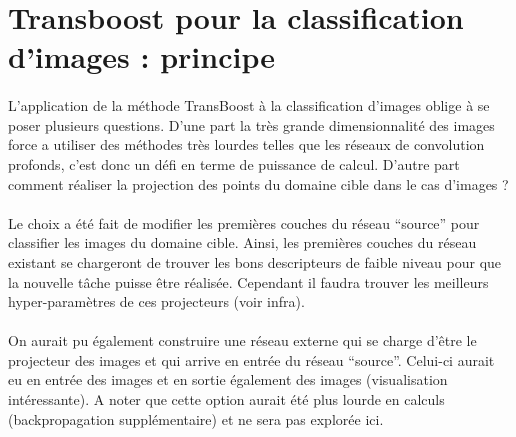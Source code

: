 \documentclass[11 pt]{article}
\begin{document}
\section{Transboost pour la classification d'images : principe}

\paragraph{}L’application de la méthode TransBoost à la classification d’images oblige à se poser plusieurs questions. D’une part la très grande dimensionnalité des images force a utiliser des méthodes très lourdes telles que les réseaux de convolution profonds, c'est donc un défi en terme de puissance de calcul. D’autre part comment réaliser la projection des points du domaine cible dans le cas d'images ?


\paragraph{} Le choix a été fait de modifier les premières couches du réseau ``source'' pour classifier les images du domaine cible. Ainsi, les premières couches du réseau existant se chargeront de trouver les bons descripteurs de faible niveau pour que la nouvelle tâche puisse être réalisée. Cependant il faudra trouver les meilleurs hyper-paramètres de ces projecteurs (voir infra).

\paragraph{} On aurait pu également construire une réseau externe qui se charge d'être le projecteur des images et qui arrive en entrée du réseau ``source''. Celui-ci aurait eu en entrée des images et en sortie également des images (visualisation intéressante). A noter que cette option aurait été plus lourde en calculs (backpropagation supplémentaire) et ne sera pas explorée ici.
\end{document}
